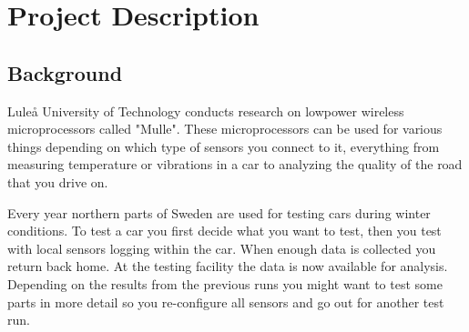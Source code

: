 


\section{Project Description}
\subsection{Background}
Luleå University of Technology conducts research on lowpower wireless microprocessors called "Mulle". 
These microprocessors can be used for various things depending on which type of sensors you connect to it, everything from measuring temperature or vibrations in a car to analyzing the quality of the road that you drive on.

Every year northern parts of Sweden are used for testing cars during winter conditions.
To test a car you first decide what you want to test, then you test with local sensors logging within the car.
When enough data is collected you return back home.
At the testing facility the data is now available for analysis.
Depending on the results from the previous runs you might want to test some parts in more detail so you re-configure all sensors and go out for another test run.

